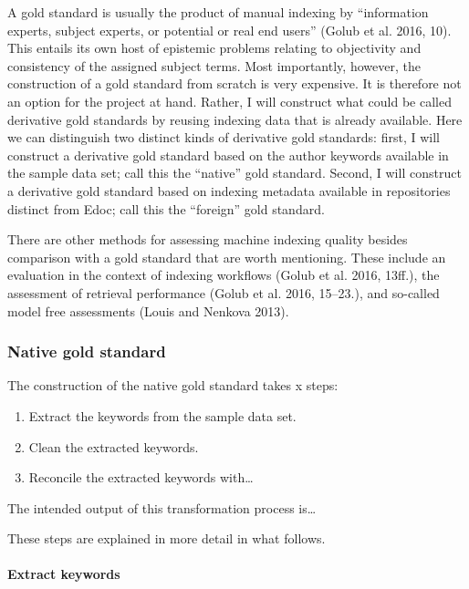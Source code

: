 A gold standard is usually the product of manual indexing by
``information experts, subject experts, or potential or real end users''
(Golub et al. 2016, 10). This entails its own host of epistemic problems
relating to objectivity and consistency of the assigned subject terms.
Most importantly, however, the construction of a gold standard from
scratch is very expensive. It is therefore not an option for the project
at hand. Rather, I will construct what could be called derivative gold
standards by reusing indexing data that is already available. Here we
can distinguish two distinct kinds of derivative gold standards: first,
I will construct a derivative gold standard based on the author keywords
available in the sample data set; call this the ``native'' gold
standard. Second, I will construct a derivative gold standard based on
indexing metadata available in repositories distinct from Edoc; call
this the ``foreign'' gold standard.

There are other methods for assessing machine indexing quality besides
comparison with a gold standard that are worth mentioning. These include
an evaluation in the context of indexing workflows (Golub et al. 2016,
13ff.), the assessment of retrieval performance (Golub et al. 2016,
15--23.), and so-called model free assessments (Louis and Nenkova 2013).

\hypertarget{native-gold-standard}{%
\subsubsection{Native gold standard}\label{native-gold-standard}}

The construction of the native gold standard takes x steps:

\begin{enumerate}
\def\labelenumi{\arabic{enumi}.}
\tightlist
\item
  Extract the keywords from the sample data set.\\
\item
  Clean the extracted keywords.
\item
  Reconcile the extracted keywords with\ldots{}
\end{enumerate}

The intended output of this transformation process is\ldots{}

These steps are explained in more detail in what follows.

\hypertarget{extract-keywords}{%
\paragraph{Extract keywords}\label{extract-keywords}}

